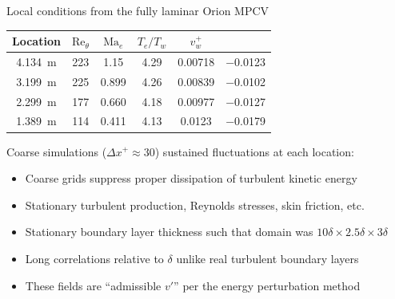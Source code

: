 \documentclass[mathserif]{beamer}
\begin{document}
\begin{frame}{Local conditions from the fully laminar Orion MPCV}
%
\begin{center}
\begin{tabular}{cccccc}
Location                              &
$\textrm{Re}_{\theta}$                & %
$\textrm{Ma}_{e}$                     & %
$T_{e}/T_w$                           & %
$v_w^{+}$                             & %
\raisebox{0.10ex}{$p_{e,\xi}^{\ast}$}   %
\\
\toprule\toprule
4.134~m    &  223       &  1.15\z   &  4.29    &  0.00718     &  \num{-0.0123}  \\
3.199~m    &  225       &  0.899    &  4.26    &  0.00839     &  \num{-0.0102}  \\
2.299~m    &  177       &  0.660    &  4.18    &  0.00977     &  \num{-0.0127}  \\
1.389~m    &  114       &  0.411    &  4.13    &  0.0123\z    &  \num{-0.0179}
\end{tabular}
\end{center}
%
\vfill
%
Coarse simulations ($\Delta{}x^{+} \approx 30$) sustained fluctuations at each location:
\begin{itemize}
    \item Coarse grids suppress proper dissipation of turbulent kinetic energy
    \item Stationary turbulent production, Reynolds stresses, skin friction, etc.
    \item Stationary boundary layer thickness such that
          domain was $10\delta \times 2.5\delta \times 3\delta$
    \item Long correlations relative to $\delta$ unlike real turbulent boundary layers
    \item These fields are ``admissible $v'$'' per the energy perturbation method
\end{itemize}
%
\end{frame}
\end{document}
